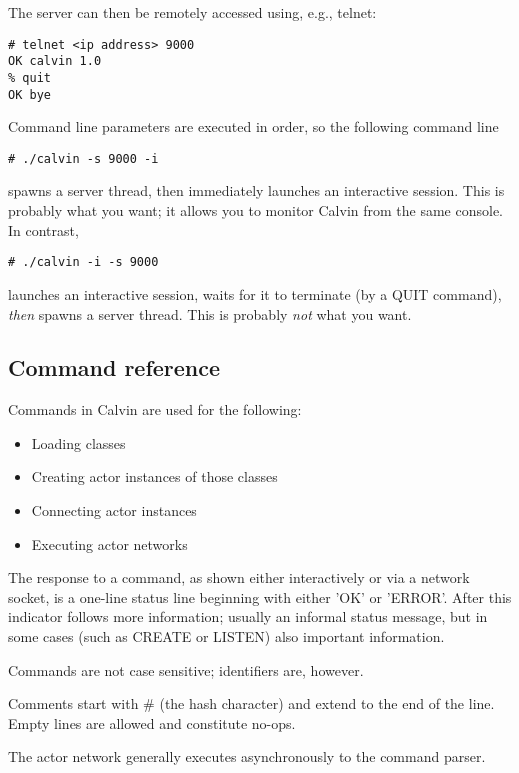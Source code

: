 \documentclass[10pt, a4paper]{article}
\begin{document}
The server can then be remotely accessed using, e.g., telnet:

\begin{verbatim}
# telnet <ip address> 9000
OK calvin 1.0
% quit
OK bye
\end{verbatim}

Command line parameters are executed in order, so the following command line
\begin{verbatim}
# ./calvin -s 9000 -i
\end{verbatim}

spawns a server thread, then immediately launches an interactive
session. This is probably what you want; it allows you to monitor
Calvin from the same console. In contrast,

\begin{verbatim}
# ./calvin -i -s 9000
\end{verbatim}

launches an interactive session, waits for it to terminate (by a QUIT
command), {\em then} spawns a server thread. This is probably {\em
  not} what you want.

\subsection{Command reference}

Commands in Calvin are used for the following:

\begin{itemize}
\item Loading classes
\item Creating actor instances of those classes
\item Connecting actor instances
\item Executing actor networks
\end{itemize}

The response to a command, as shown either interactively or via a
network socket, is a one-line status line beginning with either 'OK'
or 'ERROR'. After this indicator follows more information; usually an
informal status message, but in some cases (such as CREATE or LISTEN)
also important information.

Commands are not case sensitive; identifiers are, however.

Comments start with \# (the hash character) and extend to the end of
the line. Empty lines are allowed and constitute no-ops.

The actor network generally executes asynchronously to the command
parser.
\end{document}

